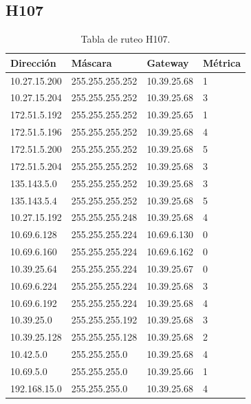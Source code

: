 \documentclass[12pt,titlepage]{article}
\begin{document}
\subsection{H107}
\begin{table}
  \begin{center}
    \begin{tabular}{|l|l|l|l|}
      \hline
        \bf{Direcci\'on} & \bf{M\'ascara} & \bf{Gateway} & \bf{M\'etrica} \\
      \hline 
	10.27.15.200  & 255.255.255.252 & 10.39.25.68 & 1 \\
        10.27.15.204  & 255.255.255.252 & 10.39.25.68 & 3 \\
        172.51.5.192  & 255.255.255.252 & 10.39.25.65 & 1 \\
        172.51.5.196  & 255.255.255.252 & 10.39.25.68 & 4 \\
        172.51.5.200  & 255.255.255.252 & 10.39.25.68 & 5 \\
        172.51.5.204  & 255.255.255.252 & 10.39.25.68 & 3 \\
        135.143.5.0   & 255.255.255.252 & 10.39.25.68 & 3 \\
        135.143.5.4   & 255.255.255.252 & 10.39.25.68 & 5 \\ 	
	10.27.15.192  & 255.255.255.248 & 10.39.25.68 & 4 \\
	10.69.6.128   & 255.255.255.224 & 10.69.6.130 & 0 \\
        10.69.6.160   & 255.255.255.224 & 10.69.6.162 & 0 \\
	10.39.25.64   & 255.255.255.224 & 10.39.25.67 & 0 \\       
	10.69.6.224   & 255.255.255.224 & 10.39.25.68 & 3 \\
	10.69.6.192   & 255.255.255.224 & 10.39.25.68 & 4 \\	
	10.39.25.0    & 255.255.255.192 & 10.39.25.68 & 3 \\
	10.39.25.128  & 255.255.255.128 & 10.39.25.68 & 2 \\
	10.42.5.0     & 255.255.255.0 & 10.39.25.68 & 4 \\
        10.69.5.0     & 255.255.255.0 & 10.39.25.66 & 1 \\
        192.168.15.0  & 255.255.255.0 & 10.39.25.68 & 4 \\  
    \hline
    \end{tabular} \\
  \end{center}
  \caption{Tabla de ruteo H107.}
\end{table}
\FloatBarrier
\end{document}
